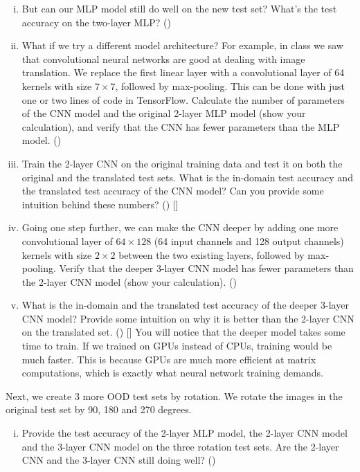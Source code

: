 \begin{enumerate}[(i).]
\item But can our MLP model still do well on the new test set? What's the test accuracy on the two-layer MLP? (\blue {1pt})
\item What if we try a different model architecture? For example, in class we saw that convolutional neural networks are good at dealing with image translation. We replace the first linear layer with a convolutional layer of 64 kernels with size $7\times7$, followed by max-pooling. This can be done with just one or two lines of code in TensorFlow. Calculate the number of parameters of the CNN model and the original 2-layer MLP model (show your calculation), and verify that the CNN has fewer parameters than the MLP model. ()
\item Train the 2-layer CNN on the original training data and test it on both the original and the translated test sets. What is the in-domain test accuracy and the translated test accuracy of the CNN model? Can you provide some intuition behind these numbers? () []
\item Going one step further, we can make the CNN deeper by adding one more convolutional layer of $64\times128$ (64 input channels and 128 output channels) kernels with size $2\times2$ between the two existing layers, followed by max-pooling. Verify that the deeper 3-layer CNN model has fewer parameters than the 2-layer CNN model (show your calculation). () 
\item What is the in-domain and the translated test accuracy of the deeper 3-layer CNN model? Provide some intuition on why it is better than the 2-layer CNN on the translated set. () [] You will notice that the deeper model takes some time to train. If we trained on GPUs instead of CPUs, training would be much faster. This is because GPUs are much more efficient at matrix computations, which is exactly what neural network training demands.
\end{enumerate}

\noindent Next, we create 3 more OOD test sets by rotation. We rotate the images in the original test set by 90, 180 and 270 degrees.

\begin{enumerate}[(vi).]
    \item Provide the test accuracy of the 2-layer MLP model, the 2-layer CNN model and the 3-layer CNN model on the three rotation test sets. Are the 2-layer CNN and the 3-layer CNN still doing well? ()
\end{enumerate}



